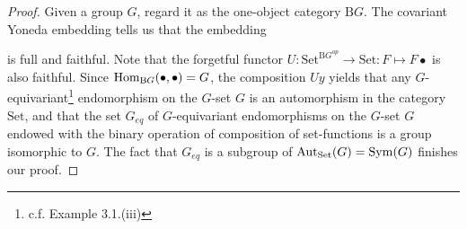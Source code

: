 	\begin{proof}
		Given a group $G$, regard it as the one-object category $\mathrm{B}G$. The covariant Yoneda embedding tells us that the embedding
		\begin{center}
	\end{center}
	is full and faithful. Note that the forgetful functor $U:\mathrm{Set}^{\mathrm{B}G^{op}}\to \mathrm{Set}:F\mapsto F\bullet$ is also faithful. Since $\operatorname{Hom}_{\mathrm{B}G}(\bullet,\bullet)=G$, the composition $Uy$ yields that any $G$-equivariant\footnote{c.f. Example 3.1.(iii)} endomorphism on the $G$-set $G$ is an automorphism in the category $\mathrm{Set}$, and that the set $G_{eq}$ of $G$-equivariant endomorphisms on the $G$-set $G$ endowed with the binary operation of composition of set-functions is a group isomorphic to $G$. The fact that $G_{eq}$ is a subgroup of $\operatorname{Aut}_\mathrm{Set}(G)=\operatorname{Sym}(G)$ finishes our proof.
	\end{proof}